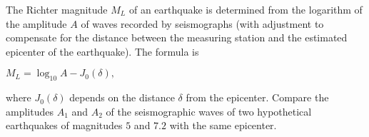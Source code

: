 The Richter magnitude $M_L$ of an earthquake is determined from the logarithm of the amplitude $A$ of waves recorded by seismographs (with adjustment to compensate for the distance between the measuring station and the estimated epicenter of the earthquake). The formula is

\hfil \hfil$
M_L=\log_{10}A -J_0(\delta),
$

\noindent where $J_0(\delta)$ depends on the distance $\delta$ from the epicenter. Compare the amplitudes $A_1$ and $A_2$ of the seismographic waves of two hypothetical earthquakes of magnitudes $5$ and $7.2$ with the same epicenter.


